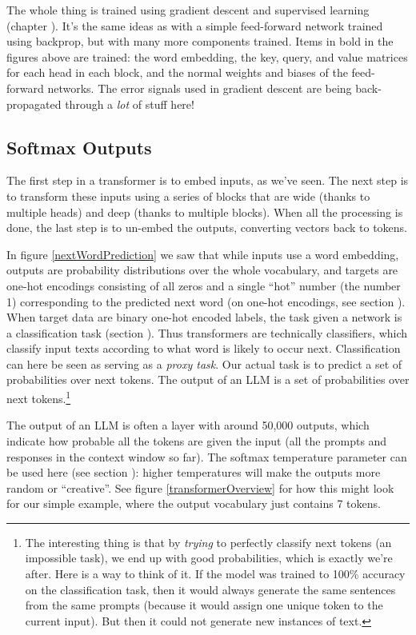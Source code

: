The whole thing is trained using gradient descent and supervised learning (chapter ). It's the same ideas as with a simple feed-forward network trained using backprop, but with many more components trained. Items in bold in the figures above are trained: the word embedding, the key, query, and value matrices for each head in each block, and the normal weights and biases of the feed-forward networks. The error signals used in gradient descent are being back-propagated through a \emph{lot} of stuff here!

\subsection{Softmax Outputs}\label{llmOutput}

The first step in a transformer is to embed inputs, as we've seen. The next step is to transform these inputs using a series of blocks that are wide (thanks to multiple heads) and deep (thanks to multiple blocks). When all the processing is done, the last step is to un-embed the outputs, converting vectors back to tokens. 

In figure \ref{nextWordPrediction} we saw that while inputs use a word embedding, outputs are probability distributions over the whole vocabulary, and targets are one-hot encodings consisting of all zeros and a single ``hot'' number (the number 1) corresponding to the predicted next word (on one-hot encodings, see section ). When target data are binary one-hot encoded labels, the task given a network is a classification task (section ). Thus transformers are technically classifiers, which classify input texts according to what word is likely to occur next. Classification can here be seen as serving as a \emph{proxy task}. Our actual task is to predict a set of probabilities over next tokens. The output of an LLM is a set of probabilities over next tokens.\footnote{The interesting thing is that by \emph{trying} to perfectly classify next tokens (an impossible task), we end up with good probabilities, which is exactly we're after. Here is a way to think of it. If the model was trained to 100\% accuracy on the classification task, then it would always generate the same sentences from the same prompts (because it would assign one unique token to the current input). But then it could not generate new instances of text.}

The output of an LLM is often a  layer with around 50,000 outputs, which  indicate how probable all the tokens are given the input (all the prompts and responses in the context window so far). The softmax temperature parameter can be used here (see section ): higher temperatures will make the outputs more random or ``creative''. See figure \ref{transformerOverview} for how this might look for our simple example, where the output vocabulary just contains 7 tokens. 

